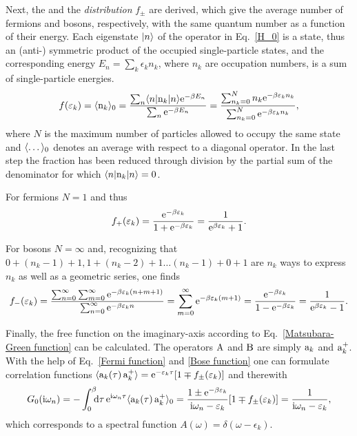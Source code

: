 Next, the \emph{} and the \emph{
distribution} $f_\pm$ are derived, which give the average number of fermions and
bosons, respectively, with the same quantum number as a function of their
energy. Each eigenstate $|n\rangle$ of the  operator in
Eq.~\ref{H_0} is a  state, thus an (anti-) symmetric product of the
occupied single-particle states, and the corresponding energy $E_n = \sum_k
\epsilon_k n_k$, where $n_k$ are occupation numbers, is a sum of single-particle
energies.
%
\begin{equation*}
    f(\varepsilon_k) = \langle\mathrm n_k\rangle_0 = \frac{\sum_n \langle n| \mathrm n_k |n\rangle \mathrm e^{-\beta E_n}}{\sum_n \mathrm e^{-\beta E_n}} = \frac{\sum_{n_k = 0}^N n_k \mathrm e^{-\beta \varepsilon_k n_k}}{\sum_{n_k = 0}^N \mathrm e^{-\beta \varepsilon_k n_k}},
\end{equation*}
%
where $N$ is the maximum number of particles allowed to occupy the same state
and $\langle\dots\rangle_0$ denotes an average with respect to a diagonal 
operator. In the last step the fraction has been reduced through division by the
partial sum of the denominator for which $\langle n| \mathrm n_k |n\rangle = 0$.

For fermions $N = 1$ and thus
%
\begin{equation} \label{Fermi function}
    f_+(\varepsilon_k) = \frac{\mathrm e^{-\beta \varepsilon_k}}{1 + \mathrm e^{-\beta \varepsilon_k}}
    = \frac 1 {\mathrm e^{\beta \varepsilon_k} + 1}.
\end{equation}

For bosons $N = \infty$ and, recognizing that $0 + (n_k - 1) + 1, 1 + (n_k - 2)
+ 1 \dots (n_k - 1) + 0 + 1$ are $n_k$ ways to express $n_k$ as well as a
geometric series, one finds
%
\begin{equation} \label{Bose function}
    f_-(\varepsilon_k)
    = \frac {\sum_{n = 0}^\infty \sum_{m = 0}^\infty
        \mathrm e^{-\beta \varepsilon_k (n + m + 1)}}
        {\sum_{n = 0}^\infty \mathrm e^{-\beta \varepsilon_k n}}
    = \sum_{m = 0}^\infty \mathrm e^{-\beta \varepsilon_k (m + 1)}
    = \frac{\mathrm e^{-\beta \varepsilon_k}}{1 - \mathrm e^{-\beta \varepsilon_k}}
    = \frac 1 {\mathrm e^{\beta \varepsilon_k} - 1}.
\end{equation}

Finally, the free  function on the imaginary-axis
according to Eq.~\ref{Matsubara-Green function} can be calculated. The operators
$\mathrm A$ and $\mathrm B$ are simply $\mathrm a_k$ and $\mathrm a_k^+$. With the help of
Eq.~\ref{Fermi function} and \ref{Bose function} one can formulate correlation
functions $\langle\mathrm a_k(\tau) \, \mathrm a_k^+\rangle = \mathrm e^{-\varepsilon_k \tau} [1 \mp f_\pm(\varepsilon_k)]$ and therewith
%
\begin{equation*}
    G_0(\I \omega_n) = -\int \from 0 \till \beta \D \tau \,
    \E^{\I \omega_n \tau} \av{\op a_k(\tau) \, \op a_k^+}_0
    = \frac{1 \pm \E^{-\beta \epsilon_k}}{\I \omega_n - \epsilon_k}
        [1 \mp f_\pm(\epsilon_k)]
    = \frac 1 {\I \omega_n - \epsilon_k},
\end{equation*}
%
which corresponds to a spectral function $A(\omega) = \delta(\omega -
\epsilon_k)$.

